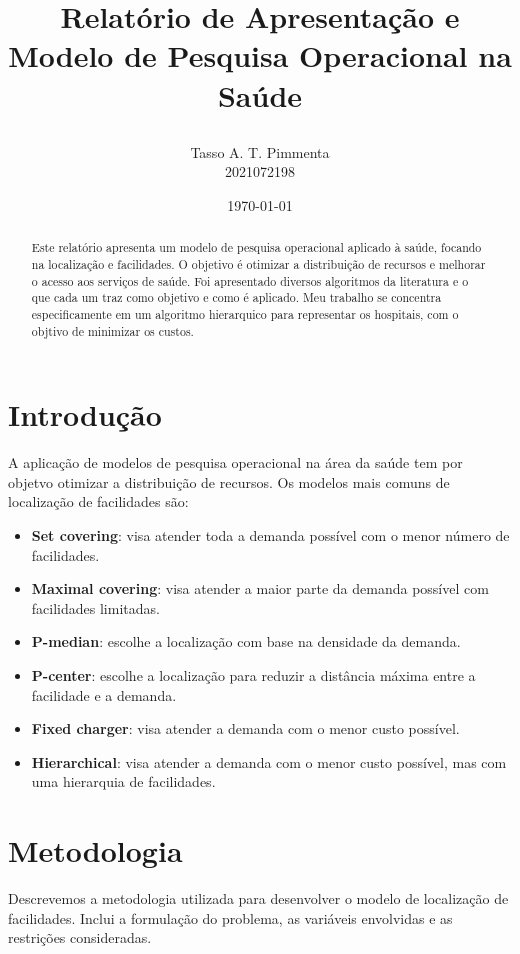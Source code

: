 \documentclass[a4paper,12pt]{article}
\title{
    \begin{center}
    \textbf{\fontsize{12}{14} \selectfont Relatório de Apresentação e Modelo de Pesquisa Operacional na Saúde}
    \end{center}
}
\author{Tasso A. T. Pimmenta \\ 2021072198}
\date{\today}
\begin{document}
\maketitle


\begin{abstract}
Este relatório apresenta um modelo de pesquisa operacional aplicado à saúde, focando na localização e facilidades. 
O objetivo é otimizar a distribuição de recursos e melhorar o acesso aos serviços de saúde.
Foi apresentado diversos algoritmos da literatura e o que cada um traz como objetivo e como é aplicado.
Meu trabalho se concentra especificamente em um algoritmo hierarquico para representar os hospitais, 
com o objtivo de minimizar os custos.
\end{abstract}

\newpage

\tableofcontents

\section{Introdução}
A aplicação de modelos de pesquisa operacional na área da saúde tem por objetvo otimizar a distribuição de recursos.
Os modelos mais comuns de localização de facilidades são:
\begin{itemize}
    \item \textbf{Set covering}: visa atender toda a demanda possível com o menor número de facilidades.
    \item \textbf{Maximal covering}: visa atender a maior parte da demanda possível com facilidades limitadas.
    \item \textbf{P-median}: escolhe a localização com base na densidade da demanda.
    \item \textbf{P-center}: escolhe a localização para reduzir a distância máxima entre a facilidade e a demanda.
    \item \textbf{Fixed charger}: visa atender a demanda com o menor custo possível.
    \item \textbf{Hierarchical}: visa atender a demanda com o menor custo possível, mas com uma hierarquia de facilidades.
\end{itemize}

\section{Metodologia}
Descrevemos a metodologia utilizada para desenvolver o modelo de localização de facilidades. 
Inclui a formulação do problema, as variáveis envolvidas e as restrições consideradas.
\end{document}
